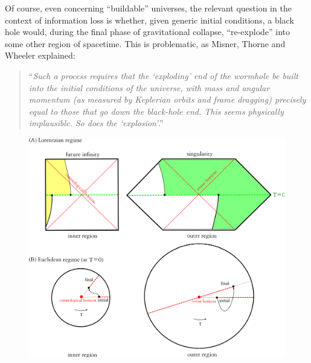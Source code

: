 \documentclass[12pt]{article}
\newcommand{\2}{$^2$}
\newcommand{\3}{$^3$}
\newcommand{\4}{$_4$}
\newcommand{\5}{$_5$}
\begin{document}
Of course, even concerning ``buildable'' universes, the relevant question in the context of information loss is whether, given generic initial conditions, a black hole would, during the final phase of gravitational collapse, ``re-explode'' into some other region of spacetime. This is problematic, as Misner, Thorne and Wheeler \cite{MTW} explained:
\begin{quote}
``\emph{Such a process requires that the `exploding' end of the wormhole be built into the initial conditions of the universe, with mass and angular momentum (as measured by Keplerian orbits and frame dragging) precisely equal to those that go down the black-hole end. This seems physically implausible. So does the `explosion'}.''
\end{quote}

\begin{figure}
\begin{center}
\includegraphics[scale=0.5]{FGG-eps-converted-to.pdf}

\end{center}
\end{figure}
\end{document}
